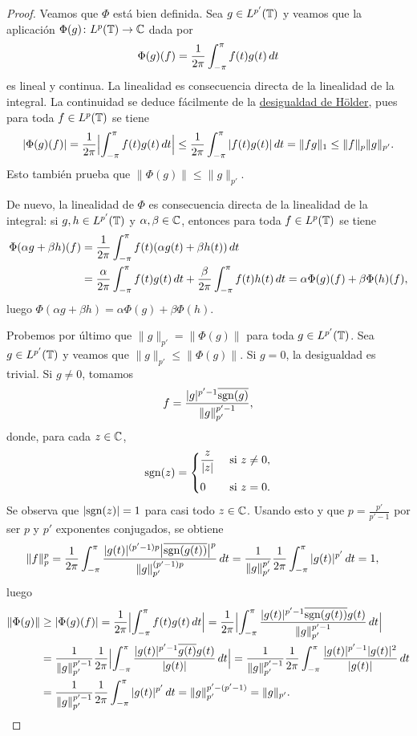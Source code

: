\documentclass[a4paper, 12pt, oneside]{book}
\begin{document}
\begin{proof}
    Veamos que $\Phi$ está bien definida. Sea $g \in L^{p'}(\mathbb T)$ y veamos que la aplicación $\Phi(g)\colon L^p(\mathbb T)\to \mathbb C$ dada por
    \[\Phi(g)(f) = \frac{1}{2\pi}\int_{-\pi}^{\pi} f(t)g(t) \, dt\]
    es lineal y continua. La linealidad es consecuencia directa de la linealidad de la integral. La continuidad se deduce fácilmente de la \hyperref[1.1.1]{\color{blue}desigualdad de Hölder}, pues para toda $f \in L^p(\mathbb T)$ se tiene
    \[|\Phi(g)(f)| = \frac{1}{2\pi}\Bigl|\int_{-\pi}^{\pi} f(t)g(t) \, dt\Bigr| \leq \frac{1}{2\pi}\int_{-\pi}^{\pi} |f(t){g(t)}| \, dt = \|fg\|_1 \leq \|f\|_p\|g\|_{p'}.\]
    Esto también prueba que $\|\Phi(g)\| \leq \|g\|_{p'}$.
    
    De nuevo, la linealidad de $\Phi$ es consecuencia directa de la linealidad de la integral: si $g,h \in L^{p'}(\mathbb T)$ y $\alpha,\beta \in \mathbb C$, entonces para toda $f \in L^p(\mathbb T)$ se tiene
    \begin{align*}
        \Phi(\alpha g + \beta h)(f) &= \frac{1}{2\pi}\int_{-\pi}^{\pi} f(t)(\alpha g(t)+\beta h(t)) \, dt \\ &= \frac{\alpha}{2\pi}\int_{-\pi}^{\pi} f(t)g(t) \, dt+\frac{\beta}{2\pi}\int_{-\pi}^{\pi} f(t)h(t) \, dt = \alpha \Phi(g)(f)+\beta \Phi(h)(f),
    \end{align*}
    luego $\Phi(\alpha g + \beta h) = \alpha \Phi(g) + \beta \Phi(h)$.

    Probemos por último que $\|g\|_{p'} = \|\Phi(g)\|$ para toda $g \in L^{p'}(\mathbb T)$. Sea $g \in L^{p'}(\mathbb T)$ y veamos que $\|g\|_{p'} \leq \|\Phi(g)\|$. Si $g = 0$, la desigualdad es trivial. Si $g \neq 0$, tomamos
    \[f = \frac{|g|^{p'-1}\overline{\textup{sgn}(g)}}{\|g\|^{p'-1}_{p'}},\]
    donde, para cada $z \in \mathbb C$,
    \[\sgn(z) = \begin{cases}
        \displaystyle \frac{z}{|z|} & $ si $ z \neq 0, \\[10pt]
        0 & $ si $ z = 0.
    \end{cases}\]
    Se observa que $|\textup{sgn}(z)| = 1$ para casi todo $z\in\mathbb C$. Usando esto y que $p = \frac{p'}{p'-1}$ por ser $p$ y $p'$ exponentes conjugados, se obtiene
    \[\begin{aligned}[t]
        \|f\|_p^p &= \frac{1}{2\pi}\int_{-\pi}^{\pi} \frac{|g(t)|^{(p'-1)p}\bigl|\overline{\textup{sgn} (g(t))}\bigr|^p}{\|g\|_{p'}^{(p'-1)p}} \, dt = \frac{1}{\|g\|_{p'}^{p'}}\frac{1}{2\pi}\int_{-\pi}^{\pi} |g(t)|^{p'} \, dt = 1,
    \end{aligned}\]
    luego
    \[\begin{aligned}[t]
        \|\Phi(g)\| &\geq |\Phi(g)(f)| = \frac{1}{2\pi}\Bigl|\int_{-\pi}^{\pi} f(t)g(t) \, dt\Bigr| = \frac{1}{2\pi}\Bigl|\int_{-\pi}^{\pi} \frac{|g(t)|^{p'-1}\overline{\textup{sgn}(g(t))}g(t)}{\|g\|_{p'}^{p'-1}} \, dt\Bigr| \\
        &= \frac{1}{\|g\|_{p'}^{p'-1}} \frac{1}{2\pi}\Bigl|\int_{-\pi}^{\pi} \frac{|g(t)|^{p'-1}\overline{g(t)}g(t)}{|g(t)|} \, dt\Bigr| = \frac{1}{\|g\|_{p'}^{p'-1}} \frac{1}{2\pi}\int_{-\pi}^{\pi} \frac{|g(t)|^{p'-1}|g(t)|^2}{|g(t)|} \, dt
        \\ &= \frac{1}{\|g\|_{p'}^{p'-1}} \frac{1}{2\pi}\int_{-\pi}^{\pi} |g(t)|^{p'} \, dt = \|g\|_{p'}^{p'-(p'-1)} = \|g\|_{p'}.
    \end{aligned}\]


\end{proof}
\end{document}
